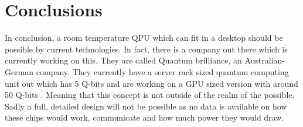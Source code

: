 \section{Conclusions}
\label{sec:conclusions}
In conclusion, a room temperature QPU which can fit in a desktop should be possible by current technologies. In fact, there is a company out there which is currently working on this. They are called Quantum brilliance, an Australian-German company. They currently have a server rack sized quantum computing unit out which has 5 Q-bits and are working on a GPU sized version with around 50 Q-bits \cite{article1}. Meaning that this concept is not outside of the realm of the possible. Sadly a full, detailed design will not be possible as no data is available on how these chips would work, communicate and how much power they would draw. 